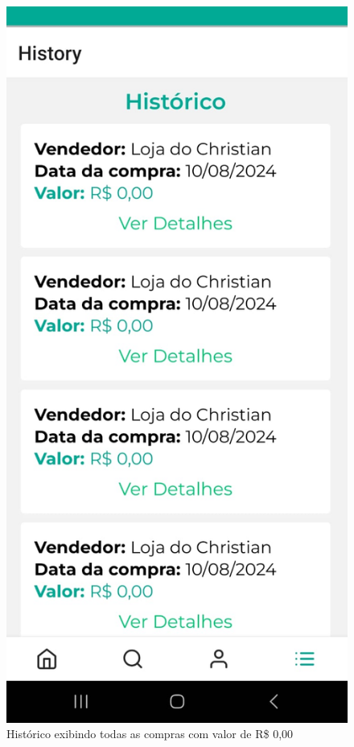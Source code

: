 \begin{figure}[h]
	\centering
	\includegraphics[keepaspectratio=true,scale=0.4]{figuras/historyzero.png}
	\caption{Histórico exibindo todas as compras com valor de R\$ 0,00}
	\label{historyzero}
\end{figure}

